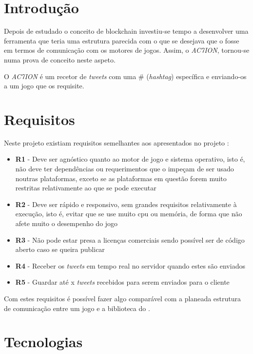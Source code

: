 \label{chap:ac7ion}
\section{Introdução}

Depois de estudado o conceito de blockchain investiu-se tempo a desenvolver uma ferramenta que teria uma estrutura parecida com o que se desejava que o \gamechaining{} fosse em termos de comunicação com os motores de jogos. Assim, o \textit{AC7ION}, tornou-se numa prova de conceito neste aspeto.

O \textit{AC7ION} é um recetor de \textit{tweets} com uma  \# (\textit{hashtag}) específica e enviando-os a um jogo que os requisite.

\section{Requisitos}

Neste projeto existiam requisitos semelhantes aos apresentados no projeto \gamechaining{}:

\begin{itemize}
	\item
	      \textbf{R1} - Deve ser agnóstico quanto ao motor de jogo e sistema operativo, isto é, não deve ter dependências ou requerimentos que o impeçam de ser usado noutras plataformas, exceto se as plataformas em questão forem muito restritas relativamente ao que se pode executar
	\item
	      \textbf{R2} - Deve ser rápido e responsivo, sem grandes requisitos relativamente à execução, isto é, evitar que se use muito \acrshort{cpu} ou memória, de forma que não afete muito o desempenho do jogo
	\item
	      \textbf{R3} - Não pode estar presa a licenças comerciais sendo possível ser de código aberto caso se queira publicar
    \item 
        \textbf{R4} - Receber os \textit{tweets} em tempo real no servidor quando estes são enviados 
    \item 
        \textbf{R5} - Guardar até x \textit{tweets} recebidos para serem enviados para o cliente
\end{itemize}

Com estes requisitos é possível fazer algo comparável com a planeada estrutura de comunicação entre um jogo e a biblioteca do \gamechaining{}.

\section{Tecnologias}

